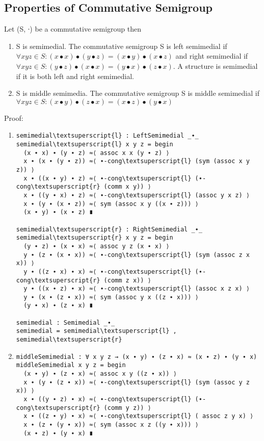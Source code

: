 \subsection{Properties of Commutative Semigroup}
Let (S, ∙) be a commutative semigroup then
\begin{enumerate}
\item S is semimedial. The commutative semigroup S is left semimedial if  \( \forall x y z \in S: (x ∙ x) ∙ (y ∙ z) = (x ∙ y) ∙ (x ∙ z) \) and right semimedial if \( \forall x y z \in S: (y ∙ z) ∙ (x ∙ x) = (y ∙ x) ∙ (z ∙ x) \). A structure is semimedial if it is both left and right semimedial. 
\item S is middle semimedia.  The commutative semigroup S is middle semimedial if  \(\forall x y z  \in S: (x ∙ y) ∙ (z ∙ x) = (x ∙ z) ∙ (y ∙ x)\)
\end{enumerate}
Proof:
\begin{enumerate}
\item
\begin{Verbatim}[commandchars=\\\{\},samepage=true]
semimedial\textsuperscript{l} : LeftSemimedial _∙_
semimedial\textsuperscript{l} x y z = begin
  (x ∙ x) ∙ (y ∙ z) ≈⟨ assoc x x (y ∙ z) ⟩
  x ∙ (x ∙ (y ∙ z)) ≈⟨ ∙-cong\textsuperscript{l} (sym (assoc x y z)) ⟩
  x ∙ ((x ∙ y) ∙ z) ≈⟨ ∙-cong\textsuperscript{l} (∙-cong\textsuperscript{r} (comm x y)) ⟩
  x ∙ ((y ∙ x) ∙ z) ≈⟨ ∙-cong\textsuperscript{l} (assoc y x z) ⟩
  x ∙ (y ∙ (x ∙ z)) ≈⟨ sym (assoc x y ((x ∙ z))) ⟩
  (x ∙ y) ∙ (x ∙ z) ∎

semimedial\textsuperscript{r} : RightSemimedial _∙_
semimedial\textsuperscript{r} x y z = begin
  (y ∙ z) ∙ (x ∙ x) ≈⟨ assoc y z (x ∙ x) ⟩
  y ∙ (z ∙ (x ∙ x)) ≈⟨ ∙-cong\textsuperscript{l} (sym (assoc z x x)) ⟩
  y ∙ ((z ∙ x) ∙ x) ≈⟨ ∙-cong\textsuperscript{l} (∙-cong\textsuperscript{r} (comm z x)) ⟩
  y ∙ ((x ∙ z) ∙ x) ≈⟨ ∙-cong\textsuperscript{l} (assoc x z x) ⟩
  y ∙ (x ∙ (z ∙ x)) ≈⟨ sym (assoc y x ((z ∙ x))) ⟩
  (y ∙ x) ∙ (z ∙ x) ∎

semimedial : Semimedial _∙_
semimedial = semimedial\textsuperscript{l} , semimedial\textsuperscript{r}
\end{Verbatim}
\item
\begin{Verbatim}[commandchars=\\\{\},samepage=true]
middleSemimedial : ∀ x y z → (x ∙ y) ∙ (z ∙ x) ≈ (x ∙ z) ∙ (y ∙ x)
middleSemimedial x y z = begin
  (x ∙ y) ∙ (z ∙ x) ≈⟨ assoc x y ((z ∙ x)) ⟩
  x ∙ (y ∙ (z ∙ x)) ≈⟨ ∙-cong\textsuperscript{l} (sym (assoc y z x)) ⟩
  x ∙ ((y ∙ z) ∙ x) ≈⟨ ∙-cong\textsuperscript{l} (∙-cong\textsuperscript{r} (comm y z)) ⟩
  x ∙ ((z ∙ y) ∙ x) ≈⟨ ∙-cong\textsuperscript{l} ( assoc z y x) ⟩
  x ∙ (z ∙ (y ∙ x)) ≈⟨ sym (assoc x z ((y ∙ x))) ⟩
  (x ∙ z) ∙ (y ∙ x) ∎
\end{Verbatim}
\end{enumerate}
